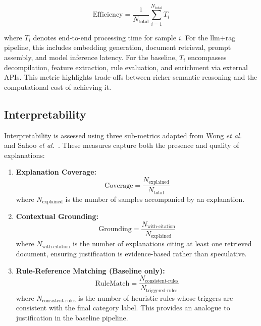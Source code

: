\begin{equation}
      \text{Efficiency} = \frac{1}{N_{\text{total}}} \sum_{i=1}^{N_{\text{total}}} T_i
\end{equation}

where \(T_i\) denotes end-to-end processing time for sample \(i\). For the \gls{llm}+\gls{rag}
pipeline, this includes embedding generation, document retrieval, prompt assembly, and model
inference latency. For the baseline, \(T_i\) encompasses decompilation, feature extraction, rule
evaluation, and enrichment via external APIs. This metric highlights trade-offs between richer
semantic reasoning and the computational cost of achieving it.

\subsection{Interpretability}\label{subsec:Interpretability}

Interpretability is assessed using three sub-metrics adapted from Wong \emph{et
      al.}~\cite{wong2021practice} and Sahoo \emph{et al.}~\cite{sahoo2024systematic}. These measures
capture both the presence and quality of explanations:

\begin{enumerate}
      \item \textbf{Explanation Coverage:}
            \begin{equation}
                  \text{Coverage} = \frac{N_{\text{explained}}}{N_{\text{total}}}
            \end{equation}
            where \(N_{\text{explained}}\) is the number of samples accompanied by an explanation.

      \item \textbf{Contextual Grounding:}
            \begin{equation}
                  \text{Grounding} = \frac{N_{\text{with-citation}}}{N_{\text{explained}}}
            \end{equation}
            where \(N_{\text{with-citation}}\) is the number of explanations citing at least one retrieved document,
            ensuring justification is evidence-based rather than speculative.

      \item \textbf{Rule-Reference Matching (Baseline only):}
            \begin{equation}
                  \text{RuleMatch} = \frac{N_{\text{consistent-rules}}}{N_{\text{triggered-rules}}}
            \end{equation}
            where \(N_{\text{consistent-rules}}\) is the number of heuristic rules whose triggers
            are consistent with the final category label. This provides an analogue to justification
            in the baseline pipeline.
\end{enumerate}


